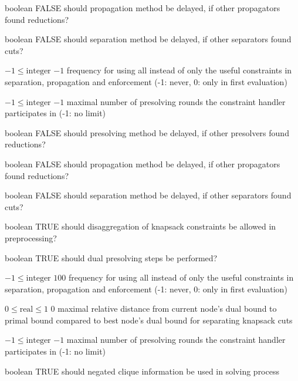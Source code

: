 %
{boolean}%
{FALSE}%
{should propagation method be delayed, if other propagators found reductions?}%
{}

%
{boolean}%
{FALSE}%
{should separation method be delayed, if other separators found cuts?}%
{}

%
{$-1\leq\textrm{integer}$}%
{$-1$}%
{frequency for using all instead of only the useful constraints in separation, propagation and enforcement (-1: never, 0: only in first evaluation)}%
{}

%
{$-1\leq\textrm{integer}$}%
{$-1$}%
{maximal number of presolving rounds the constraint handler participates in (-1: no limit)}%
{}

%
{boolean}%
{FALSE}%
{should presolving method be delayed, if other presolvers found reductions?}%
{}

%
{boolean}%
{FALSE}%
{should propagation method be delayed, if other propagators found reductions?}%
{}

%
{boolean}%
{FALSE}%
{should separation method be delayed, if other separators found cuts?}%
{}

%
{boolean}%
{TRUE}%
{should disaggregation of knapsack constraints be allowed in preprocessing?}%
{}

%
{boolean}%
{TRUE}%
{should dual presolving steps be performed?}%
{}

%
{$-1\leq\textrm{integer}$}%
{$100$}%
{frequency for using all instead of only the useful constraints in separation, propagation and enforcement (-1: never, 0: only in first evaluation)}%
{}

%
{$0\leq\textrm{real}\leq1$}%
{$0$}%
{maximal relative distance from current node's dual bound to primal bound compared to best node's dual bound for separating knapsack cuts}%
{}

%
{$-1\leq\textrm{integer}$}%
{$-1$}%
{maximal number of presolving rounds the constraint handler participates in (-1: no limit)}%
{}

%
{boolean}%
{TRUE}%
{should negated clique information be used in solving process}%
{}

